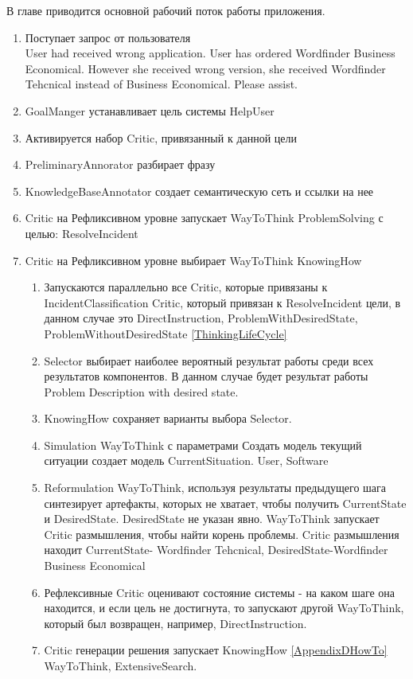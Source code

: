 В главе приводится основной рабочий поток работы приложения.
 \begin{enumerate}
	\item Поступает запрос от пользователя \\
	User had received wrong application.
User has ordered Wordfinder Business Economical.
However she received wrong version, she received Wordfinder Tehcnical instead of Business Economical. Please assist.
	\item GoalManger устанавливает цель системы HelpUser
	\item Активируется набор Critic, привязанный к данной цели
	\item PreliminaryAnnorator разбирает фразу
	\item KnowledgeBaseAnnotator создает семантическую сеть и ссылки на нее
	\item Critic на Рефликсивном уровне запускает WayToThink ProblemSolving с целью: ResolveIncident
	\item Critic на Рефликсивном уровне выбирает WayToThink KnowingHow
	\begin{enumerate}
	\item Запускаются параллельно все Critic, которые привязаны к IncidentClassification Critic, который привязан к ResolveIncident цели, в данном случае это DirectInstruction, ProblemWithDesiredState, ProblemWithoutDesiredState \ref{ThinkingLifeCycle}
	\item Selector выбирает наиболее вероятный результат работы среди всех результатов компонентов. В данном случае будет результат работы Problem Description with desired state.
	\item KnowingHow сохраняет варианты выбора Selector.
	\item Simulation WayToThink с параметрами Создать модель текущий ситуации создает модель CurrentSituation. User, Software
	\item Reformulation WayToThink, используя результаты предыдущего шага синтезирует артефакты, которых не хватает, чтобы получить CurrentState и DesiredState. DesiredState не указан явно. WayToThink запускает Critic размышления, чтобы найти корень проблемы. Critic размышления находит CurrentState- Wordfinder Tehcnical, DesiredState-Wordfinder Business Economical
	\item Рефлексивные Critic оценивают состояние системы - на каком шаге она находится, и если цель не достигнута, то запускают другой WayToThink, который был возвращен, например, DirectInstruction. 
	\item Critic генерации решения запускает KnowingHow \ref{AppendixDHowTo} WayToThink, ExtensiveSearch.

\end{enumerate}
\end{enumerate}

